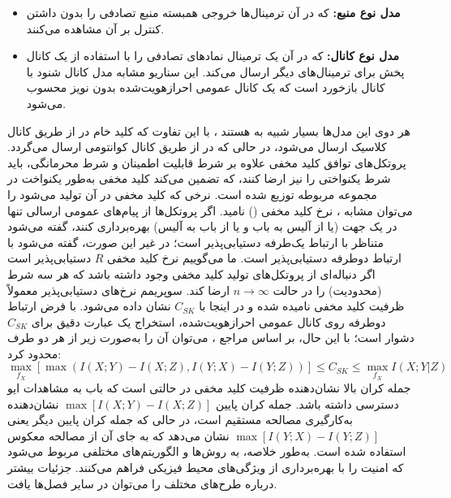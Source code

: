 \begin{itemize}
	\item \textbf{مدل نوع منبع:} که در آن ترمینال‌ها خروجی همبسته منبع تصادفی را بدون داشتن کنترل بر آن مشاهده می‌کنند.
	\item \textbf{مدل نوع کانال:} که در آن یک ترمینال نمادهای تصادفی را با استفاده از یک کانال پخش برای ترمینال‌های دیگر ارسال می‌کند. این سناریو مشابه مدل کانال شنود با کانال بازخورد است که یک کانال عمومی احرازهویت‌شده بدون نویز محسوب می‌شود.
\end{itemize}

هر دوی این مدل‌ها بسیار شبیه به  هستند \cite{1-7, 1-8, 1-9, 1-10, 1-11, 1-35, 1-36, 1-37, 1-38}، با این تفاوت که کلید خام در  از طریق کانال کلاسیک ارسال می‌شود، در حالی که در  از طریق کانال کوانتومی ارسال می‌گردد. پروتکل‌های توافق کلید مخفی علاوه بر شرط قابلیت اطمینان و شرط محرمانگی، باید شرط یکنواختی را نیز ارضا کنند، که تضمین می‌کند کلید مخفی به‌طور یکنواخت در مجموعه مربوطه توزیع شده است. نرخی که کلید مخفی در آن تولید می‌شود را می‌توان مشابه ، نرخ کلید مخفی () نامید. اگر پروتکل‌ها از پیام‌های عمومی ارسالی تنها در یک جهت (یا از آلیس به باب و یا از باب به آلیس) بهره‌برداری کنند، گفته می‌شود  متناظر با ارتباط یک‌طرفه دستیابی‌پذیر است؛ در غیر این صورت، گفته می‌شود  با ارتباط دوطرفه دستیابی‌پذیر است. ما می‌گوییم نرخ کلید مخفی $R$ دستیابی‌پذیر است اگر دنباله‌ای از پروتکل‌های تولید کلید مخفی وجود داشته باشد که هر سه شرط (محدودیت) را در حالت $n \to \infty$ ارضا کند. سوپریمم نرخ‌های  دستیابی‌پذیر معمولاً ظرفیت کلید مخفی نامیده شده و در اینجا با $C_{SK}$ نشان داده می‌شود. با فرض ارتباط دوطرفه روی کانال عمومی احرازهویت‌شده، استخراج یک عبارت دقیق برای $C_{SK}$ دشوار است؛ با این حال، بر اساس مراجع \cite{1-34, 1-39}، می‌توان آن را به‌صورت زیر از هر دو طرف محدود کرد:
\begin{equation}
	\max_{f_X} [ \max(I(X; Y) - I(X; Z), I(Y; X) - I(Y; Z)) ] \leq C_{SK} \leq \max_{f_X} I(X; Y|Z)
	\label{eq:1-10}
\end{equation}
جمله کران بالا نشان‌دهنده ظرفیت کلید مخفی در حالتی است که باب به مشاهدات ایو دسترسی داشته باشد. جمله کران پایین $\max[I(X; Y) - I(X; Z)]$ نشان‌دهنده به‌کارگیری مصالحه مستقیم است، در حالی که جمله کران پایین دیگر یعنی $\max[I(Y; X) - I(Y; Z)]$ نشان می‌دهد که به جای آن از مصالحه معکوس استفاده شده است.
به‌طور خلاصه،  به روش‌ها و الگوریتم‌های مختلفی مربوط می‌شود که امنیت را با بهره‌برداری از ویژگی‌های محیط فیزیکی فراهم می‌کنند. جزئیات بیشتر درباره طرح‌های مختلف  را می‌توان در سایر فصل‌ها یافت.

